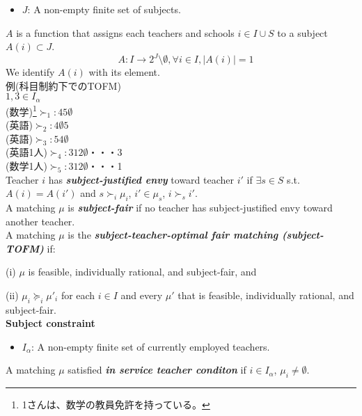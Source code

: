 \documentclass[a4j,10pt]{jsarticle}
\theoremstyle{definition}
\theoremstyle{remark}
\theoremstyle{plain}
\begin{document}
\begin{itemize}
  \item $J$: A non-empty finite set of subjects.
\end{itemize}

$A$ is a function that assigns each teachers and schools $i \in I \cup S$ to a subject $A(i) \subset J$.
\[
\quad A: I \to 2^J\setminus {\emptyset}, \forall i \in I, |A(i)|=1
\]
We identify  $A(i)$ with its element.\\

例(科目制約下でのTOFM)\\
$1,3 \in I_\alpha$\\
(数学)\footnote{1さんは、数学の教員免許を持っている。}$\succ_1:45\emptyset$\\
(英語)$\succ_2:4\emptyset 5$\\
(英語)$\succ_3:54\emptyset$\\
(英語1人)$\succ_4:312\emptyset$・・・3\\
(数学1人)$\succ_5:312\emptyset$・・・1\\
Teacher $i$ has {\bf \emph{subject-justified envy}} toward teacher $i'$ if $\exists s \in S $ s.t. $A(i) = A(i')$ and $s \succ_i \mu_i$, $i' \in \mu_s$, $i \succ_s i'$.\\
A matching $\mu$ is {\bf \emph{subject-fair}} if no teacher has subject-justified envy toward another teacher.\\
A matching $\mu$ is the {\bf \emph{subject-teacher-optimal fair matching (subject-TOFM)}} if:
  
  (i) $\mu$ is feasible, individually rational, and subject-fair, and
  
  (ii) $\mu_i \succeq_i \mu'_i$ for each $i \in I$ and every $\mu'$ that is feasible, individually rational, and subject-fair.\\

\textbf{Subject constraint}\\

\begin{itemize}
  \item $I_{\alpha}$: A non-empty finite set of currently employed teachers.
\end{itemize}

A matching $\mu$ satisfied {\bf \emph{in service teacher conditon}} if $i \in I_{\alpha}$, $\mu_i \neq \emptyset$.\\
\end{document}
